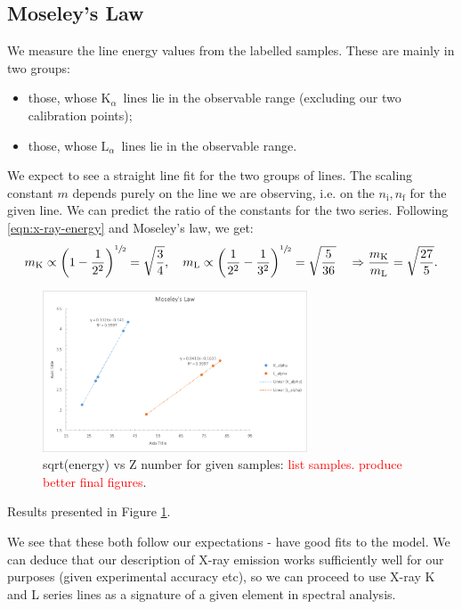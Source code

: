 \documentclass[11pt,a4paper,twoside,onecolumn]{article}
\newcommand{\reminder}[1]{\textcolor{red}{#1}}
\newcommand{\Kalpha}{$\mathrm{K}_\alpha$~}
\newcommand{\Lalpha}{$\mathrm{L}_\alpha$~}
\begin{document}
\subsection{Moseley's Law}
We measure the line energy values from the labelled samples. These are mainly in two groups:
\begin{itemize}[noitemsep]
    \item those, whose \Kalpha lines lie in the observable range (excluding our two calibration points);
    \item those, whose \Lalpha lines lie in the observable range.
\end{itemize}
We expect to see a straight line fit for the two groups of lines. The scaling constant $m$ depends purely on the line we are observing, i.e. on the $n_\mathrm{i}, n_\mathrm{f}$ for the given line. We can predict the ratio of the constants for the two series. Following \eqref{eqn:x-ray-energy} and Moseley's law, we get:
\begin{equation}
    m_\mathrm{K} \propto \left(1 - \frac{1}{2^2}\right)^{\sfrac{1}{2}} = \sqrt{\frac{3}{4}},\quad m_\mathrm{L} \propto \left(\frac{1}{2^2} - \frac{1}{3^2}\right)^{\sfrac{1}{2}} = \sqrt{\frac{5}{36}} \quad \Rightarrow \frac{m_\mathrm{K}}{m_\mathrm{L}} = \sqrt{\frac{27}{5}}.
\end{equation}
\begin{figure}[!htbp]
    \centering
    \includegraphics[width=0.7\textwidth]{img/moseleys.png}
    \caption{sqrt(energy) vs Z number for given samples: \reminder{list samples. produce better final figures}.}\label{fig:moseleys}
\end{figure}
Results presented in Figure \ref{fig:moseleys}.

We see that these both follow our expectations - have good fits to the model. We can deduce that our description of X-ray emission works sufficiently well for our purposes (given experimental accuracy etc), so we can proceed to use X-ray K and L series lines as a signature of a given element in spectral analysis.
\end{document}
